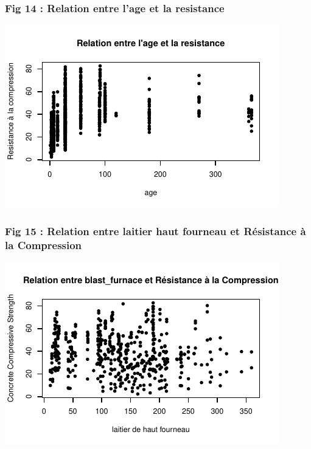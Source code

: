 \documentclass[
  12pt,
]{article}
\begin{document}
\subsubsection{Fig 14 : Relation entre l'age et la
resistance}\label{fig-14-relation-entre-lage-et-la-resistance}

\begin{center}\includegraphics{rmd_final_files/figure-latex/unnamed-chunk-34-1} \end{center}

\subsubsection{Fig 15 : Relation entre laitier haut fourneau et
Résistance à la
Compression}\label{fig-15-relation-entre-laitier-haut-fourneau-et-ruxe9sistance-uxe0-la-compression}

\begin{center}\includegraphics{rmd_final_files/figure-latex/unnamed-chunk-35-1} \end{center}
\end{document}
